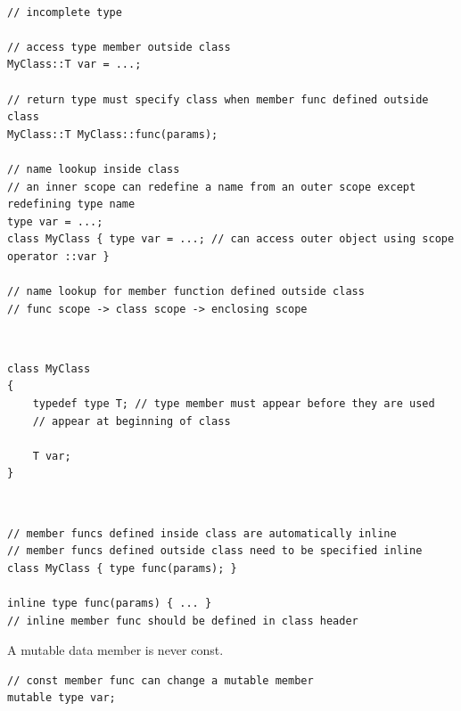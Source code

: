 \documentclass{blog}
\begin{document}
\begin{definition}~
    \begin{verbatim}
// incomplete type

// access type member outside class
MyClass::T var = ...;

// return type must specify class when member func defined outside class
MyClass::T MyClass::func(params);

// name lookup inside class
// an inner scope can redefine a name from an outer scope except redefining type name
type var = ...;
class MyClass { type var = ...; // can access outer object using scope operator ::var }

// name lookup for member function defined outside class
// func scope -> class scope -> enclosing scope
\end{verbatim}
\end{definition}

\begin{definition}~
    \begin{verbatim}
class MyClass
{
    typedef type T; // type member must appear before they are used
    // appear at beginning of class

    T var;
}
\end{verbatim}
\end{definition}

\begin{definition}~
    \begin{verbatim}
// member funcs defined inside class are automatically inline
// member funcs defined outside class need to be specified inline
class MyClass { type func(params); }

inline type func(params) { ... }
// inline member func should be defined in class header
\end{verbatim}
\end{definition}

\begin{definition}
    A mutable data member is never const.
    \begin{verbatim}
// const member func can change a mutable member
mutable type var;
\end{verbatim}
\end{definition}
\end{document}
